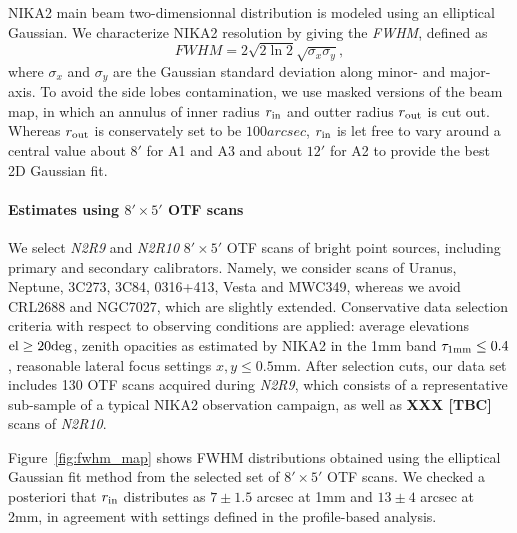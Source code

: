 NIKA2 main beam two-dimensionnal distribution is modeled using an elliptical Gaussian. We characterize NIKA2 resolution by giving the \emph{FWHM}, defined as
\begin{equation}
  FWHM = 2 \sqrt{2\ln {2}} \sqrt{\sigma_x\sigma_y},
\end{equation}
where $\sigma_x$ and $\sigma_y$ are the Gaussian standard deviation along minor- and major-axis. To avoid the side lobes contamination, we use masked versions of the beam map, in which an annulus of inner radius $r_{\rm{in}}$ and outter radius $r_{\rm{out}}$ is cut out. Whereas $r_{\rm{out}}$ is conservately set to be $100 arcsec$, $r_{\rm{in}}$ is let free to vary around a central value about $8'$ for A1 and A3 and about $12'$ for A2 to provide the best 2D Gaussian fit.  

\paragraph{Estimates using $8' \times 5'$ OTF scans}

We select \emph{N2R9} and \emph{N2R10} $8' \times 5'$ OTF scans of
bright point sources, including primary and secondary
calibrators. Namely, we consider scans of Uranus, Neptune, 3C273,
3C84, 0316+413, Vesta and MWC349, whereas we avoid CRL2688 and
NGC7027, which are slightly extended. Conservative data selection
criteria with respect to observing conditions are applied: average
elevations $\rm{el} \ge 20 \rm{deg}$, zenith opacities as estimated by
NIKA2 in the 1mm band $\tau_{1\rm{mm}} \le 0.4$, reasonable lateral
focus settings $x, y \le 0.5$mm. After selection cuts, our data set
includes 130 OTF scans acquired during \emph{N2R9}, which consists of
a representative sub-sample of a typical NIKA2 observation campaign,
as well as {\bf XXX [TBC]} scans of \emph{N2R10}. 

Figure~\ref{fig:fwhm_map} shows FWHM distributions obtained using
the elliptical Gaussian fit method from the selected set of $8' \times 5'$ OTF scans.
We checked a posteriori that $r_{\rm{in}}$ distributes as $7 \pm 1.5$ arcsec at 1mm and $13 \pm 4$ arcsec at 2mm, in agreement with settings defined in the profile-based analysis.


